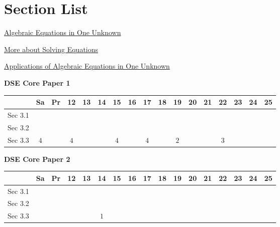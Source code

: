 \documentclass[12pt, a4paper]{article}
\begin{document}
\section*{Section List}
\begin{enumx}[label=Sec 3.\arabic*\ ]
\item \hyperref[section:1-3-1]{Algebraic Equations in One Unknown}
\item \hyperref[section:1-3-2]{More about Solving Equations}
\item \hyperref[section:1-3-3]{Applications of Algebraic Equations in One Unknown}
\end{enumx}
\begin{absolutelynopagebreak}
\begin{center}
\textbf{DSE Core Paper 1}
\end{center}
\begin{center}
\begin{tabular}{|l|c|c|c|c|c|c|c|c|c|c|c|c|c|c|c|c|}
\hline
        & Sa & Pr & 12 & 13 & 14 & 15 & 16 & 17 & 18 & 19 & 20 & 21 & 22 & 23 & 24 & 25 \\\hline\hline
Sec 3.1 &  &  &  &  &  &  &  &  &  &  &  &  &  &  &  &  \\\hline
Sec 3.2 &  &  &  &  &  &  &  &  &  &  &  &  &  &  &  &  \\\hline
Sec 3.3 &  $4$ &  &  $4$ &  &  &  $4$ &  &  $4$ &  &  $2$ &  &  &  $3$ &  &  &  \\\hline
\end{tabular}
\end{center}
\end{absolutelynopagebreak}
\begin{absolutelynopagebreak}
\begin{center}
\textbf{DSE Core Paper 2}
\end{center}
\begin{center}
\begin{tabular}{|l|c|c|c|c|c|c|c|c|c|c|c|c|c|c|c|c|}
\hline
        & Sa & Pr & 12 & 13 & 14 & 15 & 16 & 17 & 18 & 19 & 20 & 21 & 22 & 23 & 24 & 25 \\\hline\hline
Sec 3.1 &  &  &  &  &  &  &  &  &  &  &  &  &  &  &  &  \\\hline
Sec 3.2 &  &  &  &  &  &  &  &  &  &  &  &  &  &  &  &  \\\hline
Sec 3.3 &  &  &  &  &  $1$ &  &  &  &  &  &  &  &  &  &  &  \\\hline
\end{tabular}
\end{center}
\end{absolutelynopagebreak}
\end{document}
